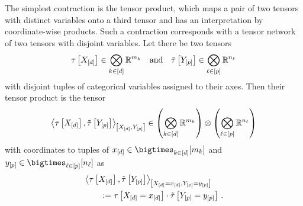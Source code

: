 \begin{example}
    \label{exa:tensorProduct}
    The simplest contraction is the tensor product, which maps a pair of two tensors with distinct variables onto a third tensor and has an interpretation by coordinate-wise products.
    Such a contraction corresponds with a tensor network of two tensors with disjoint variables.
    Let there be two tensors
    \begin{align*}
        \tau\left[X_{[d]}\right] \in \bigotimes_{k\in[d]} \mathbb{R}^{m_{k}}  \quad\text{and}\quad \tilde{\tau}\left[Y_{[p]}\right] \in \bigotimes_{\ell\in[p]}\mathbb{R}^{n_{\ell}}
    \end{align*}
    with disjoint tuples of categorical variables assigned to their axes.
    Then their tensor product is the tensor
    \begin{align*}
        \left\langle \tau\left[X_{[d]}\right],\tilde{\tau}\left[Y_{[p]}\right]\right\rangle_{\left[ X_{[d]},Y_{[p]} \right]}
        \in \left(\bigotimes_{k\in[d]} \mathbb{R}^{m_{k}}\right) \otimes \left(\bigotimes_{\ell\in[p]}\mathbb{R}^{n_{\ell}}\right)
    \end{align*}
    with coordinates to tuples of $\shortcatindices\in\facstates$ and $\shortheadindices\in\bigtimes_{\selindexin}[\headdimof{\selindex}]$ as
    \begin{align*}
        & \left\langle \tau\left[X_{[d]}\right],\tilde{\tau}\left[Y_{[p]}\right]\right\rangle_{\left[ X_{[d]}=x_{[d]},Y_{[p]}=y_{[p]} \right]} \\
        &\quad\quad := \tau\left[X_{[d]}=x_{[d]}\right]\cdot \tilde{\tau}\left[Y_{[p]}=y_{[p]}\right] \, .
    \end{align*}
\end{example}